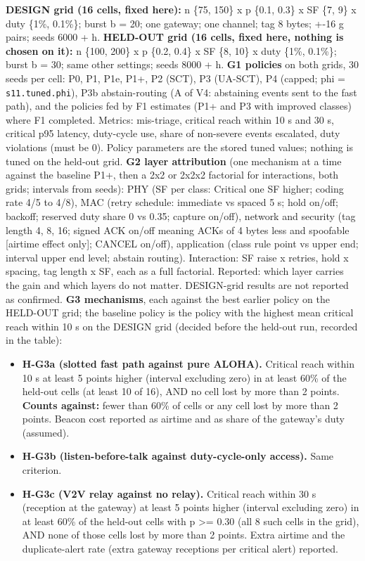 \textbf{DESIGN grid (16 cells, fixed here):} n \{75, 150\} x p \{0.1, 0.3\} x SF \{7, 9\} x duty \{1\%, 0.1\%\}; burst b = 20; one gateway; one channel; tag 8 bytes; +-16 g pairs; seeds 6000 + h.
\textbf{HELD-OUT grid (16 cells, fixed here, nothing is chosen on it):} n \{100, 200\} x p \{0.2, 0.4\} x SF \{8, 10\} x duty \{1\%, 0.1\%\}; burst b = 30; same other settings; seeds 8000 + h.
\textbf{G1 policies} on both grids, 30 seeds per cell: P0, P1, P1e, P1+, P2 (SCT), P3 (UA-SCT), P4 (capped; phi = \texttt{s11.tuned.phi}), P3b abstain-routing (A of V4: abstaining events sent to the fast path), and the policies fed by F1 estimates (P1+ and P3 with improved classes) where F1 completed. Metrics: mis-triage, critical reach within 10 s and 30 s, critical p95 latency, duty-cycle use, share of non-severe events escalated, duty violations (must be 0). Policy parameters are the stored tuned values; nothing is tuned on the held-out grid.
\textbf{G2 layer attribution} (one mechanism at a time against the baseline P1+, then a 2x2 or 2x2x2 factorial for interactions, both grids; intervals from seeds): PHY (SF per class: Critical one SF higher; coding rate 4/5 to 4/8), MAC (retry schedule: immediate vs spaced 5 s; hold on/off; backoff; reserved duty share 0 vs 0.35; capture on/off), network and security (tag length 4, 8, 16; signed ACK on/off meaning ACKs of 4 bytes less and spoofable [airtime effect only]; CANCEL on/off), application (class rule point vs upper end; interval upper end level; abstain routing). Interaction: SF raise x retries, hold x spacing, tag length x SF, each as a full factorial. Reported: which layer carries the gain and which layers do not matter. DESIGN-grid results are not reported as confirmed.
\textbf{G3 mechanisms}, each against the best earlier policy on the HELD-OUT grid; the baseline policy is the policy with the highest mean critical reach within 10 s on the DESIGN grid (decided before the held-out run, recorded in the table):
\begin{itemize}
\item \textbf{H-G3a (slotted fast path against pure ALOHA).} Critical reach within 10 s at least 5 points higher (interval excluding zero) in at least 60\% of the held-out cells (at least 10 of 16), AND no cell lost by more than 2 points. \textbf{Counts against:} fewer than 60\% of cells or any cell lost by more than 2 points. Beacon cost reported as airtime and as share of the gateway's duty (assumed).
\item \textbf{H-G3b (listen-before-talk against duty-cycle-only access).} Same criterion.
\item \textbf{H-G3c (V2V relay against no relay).} Critical reach within 30 s (reception at the gateway) at least 5 points higher (interval excluding zero) in at least 60\% of the held-out cells with p >= 0.30 (all 8 such cells in the grid), AND none of those cells lost by more than 2 points. Extra airtime and the duplicate-alert rate (extra gateway receptions per critical alert) reported.
\end{itemize}
